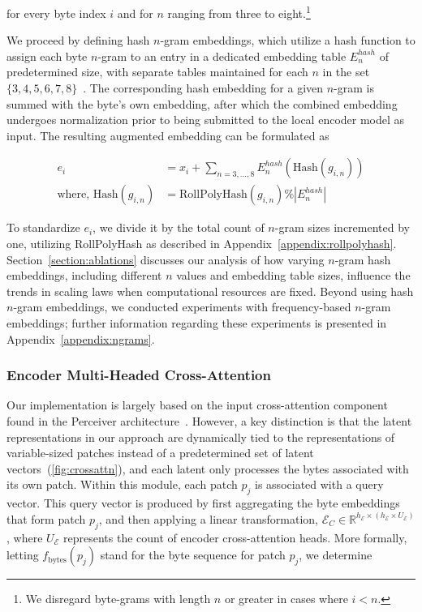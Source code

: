 for every byte index $i$ and for $n$ ranging from three to eight.\footnote{We disregard byte-grams with length $n$ or greater in cases where $i < n$.}

We proceed by defining hash $n$-gram embeddings, which utilize a hash function to assign each byte $n$-gram to an entry in a dedicated embedding table $E_{n}^{hash}$ of predetermined size, with separate tables maintained for each $n$ in the set $\{3,4,5,6,7,8\}$~\citep{bai2010learning}. The corresponding hash embedding for a given $n$-gram is summed with the byte’s own embedding, after which the combined embedding undergoes normalization prior to being submitted to the local encoder model as input. The resulting augmented embedding can be formulated as

\begin{align}
e_i &= x_i + \sum_{n = 3,...,8}E_{n}^{hash}(\text{Hash}(g_{i,n})) \\
\text{where, Hash}(g_{i,n}) &= \text{RollPolyHash}(g_{i,n}) \% |E_{n}^{hash}|
\end{align}

To standardize $e_i$, we divide it by the total count of $n$-gram sizes incremented by one, utilizing RollPolyHash as described in Appendix~\ref{appendix:rollpolyhash}. Section~\ref{section:ablations} discusses our analysis of how varying $n$-gram hash embeddings, including different $n$ values and embedding table sizes, influence the trends in scaling laws when computational resources are fixed. Beyond using hash $n$-gram embeddings, we conducted experiments with frequency-based $n$-gram embeddings; further information regarding these experiments is presented in Appendix~\ref{appendix:ngrams}.

\subsubsection{Encoder Multi-Headed Cross-Attention}
\label{sec:enc-cross-attn}
Our implementation is largely based on the input cross-attention component found in the Perceiver architecture~\citep{jaegle2021perceiver}. However, a key distinction is that the latent representations in our approach are dynamically tied to the representations of variable-sized patches instead of a predetermined set of latent vectors~(\autoref{fig:crossattn}), and each latent only processes the bytes associated with its own patch. Within this module, each patch $p_j$ is associated with a query vector. This query vector is produced by first aggregating the byte embeddings that form patch $p_j$, and then applying a linear transformation, $\mathcal{E}_{C} \in \mathbb{R}^{h_{\mathcal{E}} \times (h_{\mathcal{E}} \times U_{\mathcal{E}})}$, where $U_{\mathcal{E}}$ represents the count of encoder cross-attention heads. More formally, letting $f_{\text{bytes}}(p_j)$ stand for the byte sequence for patch $p_j$, we determine

